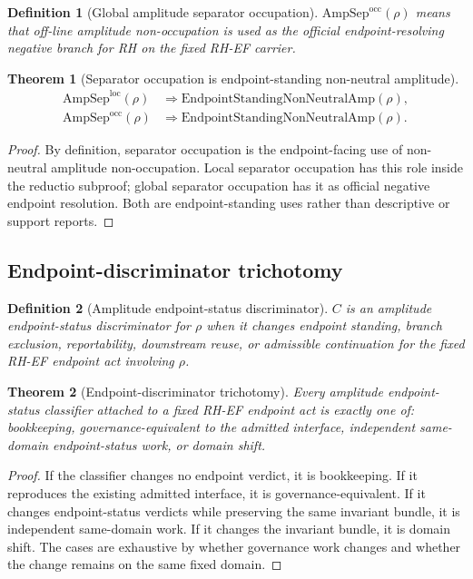 \documentclass[11pt]{article}
\newtheorem{definition}{Definition}[section]
\newtheorem{theorem}{Theorem}[section]
\newcommand{\AmpSepOcc}{\mathrm{AmpSep}^{\mathrm{occ}}}
\newcommand{\AmpSepLoc}{\mathrm{AmpSep}^{\mathrm{loc}}}
\newcommand{\AmpStand}{\mathrm{EndpointStandingNonNeutralAmp}}
\begin{document}
\begin{definition}[Global amplitude separator occupation]
\(\AmpSepOcc(\rho)\) means that off-line amplitude non-occupation is used as the official endpoint-resolving negative branch for RH on the fixed RH-EF carrier.
\end{definition}

\begin{theorem}[Separator occupation is endpoint-standing non-neutral amplitude]
\[
\begin{aligned}
\AmpSepLoc(\rho)&\Rightarrow \AmpStand(\rho),\\
\AmpSepOcc(\rho)&\Rightarrow \AmpStand(\rho).
\end{aligned}
\]
\end{theorem}

\begin{proof}
By definition, separator occupation is the endpoint-facing use of non-neutral amplitude non-occupation.  Local separator occupation has this role inside the reductio subproof; global separator occupation has it as official negative endpoint resolution.  Both are endpoint-standing uses rather than descriptive or support reports.
\end{proof}

\subsection{Endpoint-discriminator trichotomy}

\begin{definition}[Amplitude endpoint-status discriminator]
\(C\) is an amplitude endpoint-status discriminator for \(\rho\) when it changes endpoint standing, branch exclusion, reportability, downstream reuse, or admissible continuation for the fixed RH-EF endpoint act involving \(\rho\).
\end{definition}

\begin{theorem}[Endpoint-discriminator trichotomy]
Every amplitude endpoint-status classifier attached to a fixed RH-EF endpoint act is exactly one of: bookkeeping, governance-equivalent to the admitted interface, independent same-domain endpoint-status work, or domain shift.
\end{theorem}

\begin{proof}
If the classifier changes no endpoint verdict, it is bookkeeping.  If it reproduces the existing admitted interface, it is governance-equivalent.  If it changes endpoint-status verdicts while preserving the same invariant bundle, it is independent same-domain work.  If it changes the invariant bundle, it is domain shift.  The cases are exhaustive by whether governance work changes and whether the change remains on the same fixed domain.
\end{proof}
\end{document}
